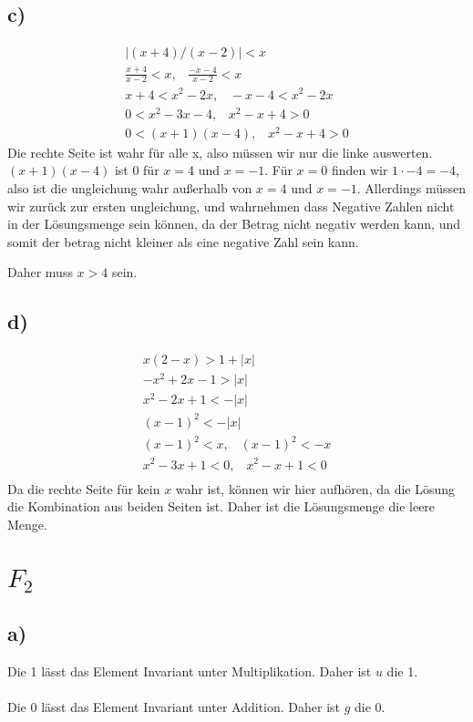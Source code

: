 \documentclass[]{scrartcl}
\begin{document}
\subsection{c)}
\begin{gather}
	|(x+4)/(x-2)| < x\\
	\frac{x+4}{x-2} < x,\;\;\;\frac{-x-4}{x-2} < x\\
	x+4 < x^2 - 2x, \;\;\; -x-4 < x^2-2x\\
	0 < x^2 - 3x - 4, \;\;\; x^2 - x + 4 > 0\\
	0 < (x+1)(x-4), \;\;\; x^2 - x + 4 > 0
\end{gather}
Die rechte Seite ist wahr für alle x, also müssen wir nur die linke auswerten. $(x+1)(x-4)$ ist $0$ für $x=4$ und $x=-1$. Für $x=0$ finden wir $1\cdot-4 = -4$, also ist die ungleichung wahr außerhalb von $x=4$ und $x=-1$. Allerdings müssen wir zurück zur ersten ungleichung, und wahrnehmen dass Negative Zahlen nicht in der Lösungsmenge sein können, da der Betrag nicht negativ werden kann, und somit der betrag nicht kleiner als eine negative Zahl sein kann.

Daher muss $x>4$ sein.

\subsection{d)}

\begin{gather}
	x(2-x) > 1 + |x|\\
	-x^2 + 2x - 1 > |x|\\
	x^2 - 2x + 1 < -|x|\\
	(x - 1)^2 < -|x|\\
	(x-1)^2 < x, \;\;\; (x-1)^2 < -x\\
	x^2 - 3x + 1 < 0, \;\;\; x^2 - x + 1 < 0\\
\end{gather}
Da die rechte Seite für kein $x$ wahr ist, können wir hier aufhören, da die Lösung die Kombination aus beiden Seiten ist. Daher ist die Lösungsmenge die leere Menge.


\section{$F_2$}
\subsection{a)}

Die 1 lässt das Element Invariant unter Multiplikation. Daher ist $u$ die 1.\\\\
Die 0 lässt das Element Invariant unter Addition. Daher ist $g$ die 0.
\end{document}
